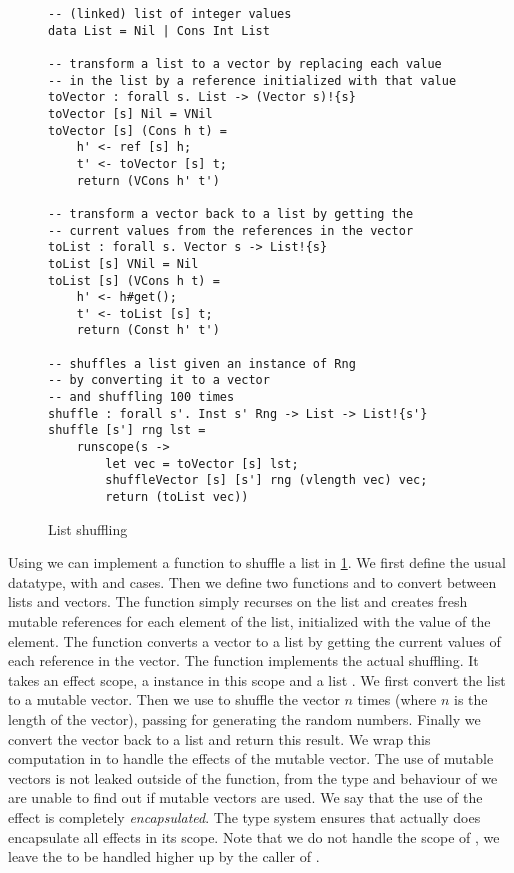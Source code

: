 \begin{figure}[H]
\caption{List shuffling}
\begin{verbatim}
-- (linked) list of integer values
data List = Nil | Cons Int List

-- transform a list to a vector by replacing each value
-- in the list by a reference initialized with that value
toVector : forall s. List -> (Vector s)!{s}
toVector [s] Nil = VNil
toVector [s] (Cons h t) =
	h' <- ref [s] h;
	t' <- toVector [s] t;
	return (VCons h' t')

-- transform a vector back to a list by getting the
-- current values from the references in the vector
toList : forall s. Vector s -> List!{s}
toList [s] VNil = Nil
toList [s] (VCons h t) =
	h' <- h#get();
	t' <- toList [s] t;
	return (Const h' t')

-- shuffles a list given an instance of Rng
-- by converting it to a vector
-- and shuffling 100 times
shuffle : forall s'. Inst s' Rng -> List -> List!{s'}
shuffle [s'] rng lst =
	runscope(s ->
		let vec = toVector [s] lst;
		shuffleVector [s] [s'] rng (vlength vec) vec;
		return (toList vec))
\end{verbatim}
\label{fig:listshuffle}
\end{figure}

Using  we can implement a function to shuffle a list in \cref{fig:listshuffle}.
We first define the usual  datatype, with  and  cases.
Then we define two functions  and  to convert between lists and vectors.
The function  simply recurses on the list and creates fresh mutable references for each element of the list, initialized with the value of the element.
The function  converts a vector to a list by getting the current values of each reference in the vector.
The function  implements the actual shuffling.
It takes an effect scope, a  instance  in this scope and a list .
We first convert the list to a mutable vector.
Then we use  to shuffle the vector $n$ times (where $n$ is the length of the vector), passing  for generating the random numbers.
Finally we convert the vector back to a list and return this result.
We wrap this computation in  to handle the effects of the mutable vector.
The use of mutable vectors is not leaked outside of the function, from the type and behaviour of  we are unable to find out if mutable vectors are used.
We say that the use of the  effect is completely \emph{encapsulated}.
The type system ensures that  actually does encapsulate all effects in its scope.
Note that we do not handle the scope of , we leave the  to be handled higher up by the caller of .

